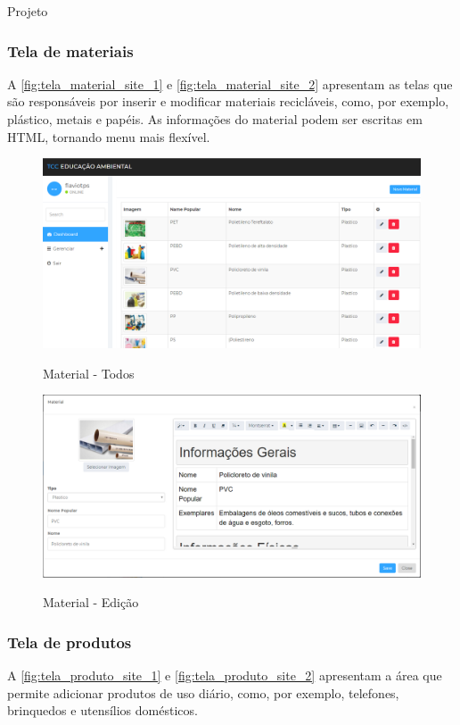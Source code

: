 \documentclass[
	12pt,				%
	openany,			%
	twoside,			%
	a4paper,			%
	english,			%
	french,				%
	spanish,			%
	brazil				%
	]{abntex2}
\begin{document}
\begin{chapter}{Projeto}
\subsubsection{Tela de materiais} \label{tela_material}
A \autoref{fig:tela_material_site_1} e \autoref{fig:tela_material_site_2} apresentam as telas que são responsáveis por inserir e modificar materiais recicláveis, como, por exemplo, plástico, metais e papéis. As informações do material podem ser escritas em HTML, tornando menu mais flexível.
\begin{figure}[h]
\centering
   \caption{Material - Todos}
   \includegraphics[scale=0.45]{media/tela_material_site_1.png}
     \label{fig:tela_material_site_1}
\end{figure}

\begin{figure}[h]
\centering
   \caption{Material - Edição}
   \includegraphics[scale=0.40]{media/tela_material_site_2.png}
     \label{fig:tela_material_site_2}
\end{figure}

\newpage
\subsubsection{Tela de produtos} \label{tela_produtos}
A \autoref{fig:tela_produto_site_1} e \autoref{fig:tela_produto_site_2} apresentam a área que permite adicionar produtos de uso diário, como, por exemplo, telefones, brinquedos e utensílios domésticos. 


\end{chapter}
\end{document}
